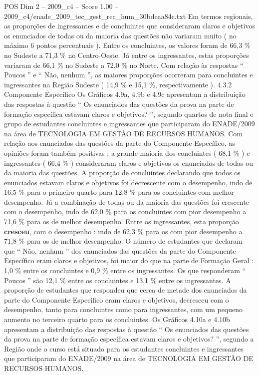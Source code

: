 \begin{textsample}{POS Dim 2 – 2009\_c4 – Score 1.00 – 2009\_c4/enade\_2009\_tec\_gest\_rec\_hum\_30bdeaa84c.txt}
Em termos regionais, as proporções de ingressantes e de concluintes que consideraram claros e objetivos os enunciados de todas ou da maioria das questões não variaram muito ( no máximo 6 pontos percentuais ).
Entre os concluintes, os valores foram de 66,3 \% no Sudeste a 71,3 \% no Centro-Oeste.
Já entre os ingressantes, estas proporções variaram de 66,1 \% no Sudeste a 72,0 \% no Norte.
Com relação às respostas “ Poucos ” e “ Não, nenhum ”, as maiores proporções ocorreram para concluintes e ingressantes na Região Sudeste ( 14,9 \% e 15,1 \%, respectivamente ). 4.3.2 Componente Específico Os Gráficos 4.9a, 4.9b e 4.9c apresentam a distribuição das respostas à questão “ Os enunciados das questões da prova na parte de formação específica estavam claros e objetivos? ”, segundo quartos de nota final e grupo de estudantes concluintes e ingressantes que participaram do ENADE/2009 na área de TECNOLOGIA EM GESTÃO DE RECURSOS HUMANOS.
Com relação aos enunciados das questões da parte do Componente Específico, as opiniões foram também positivas : a grande maioria dos concluintes ( 68,1 \% ) e ingressantes ( 66,4 \% ) consideraram claros e objetivos os enunciados de todas ou da maioria das questões.
A proporção de concluintes declarando que todos os enunciados estavam claros e objetivos foi decrescente com o desempenho, indo de 16,5 \% para o primeiro quarto para 12,8 \% para os concluintes com melhor desempenho.
Já a combinação de todas ou da maioria das questões foi crescente com o desempenho, indo de 62,0 \% para os concluintes com pior desempenho a 71,6 \% para os de melhor desempenho.
Entre os ingressantes, esta proporção \textbf{cresceu}, com o desempenho : indo de 62,3 \% para os com pior desempenho a 71,8 \% para os de melhor desempenho.
O número de estudantes que declaram que “ Não, nenhum ” dos enunciados das questões da parte do Componente Específico eram claros e objetivos, foi maior do que na parte de Formação Geral : 1,0 \% entre os concluintes e 0,9 \% entre os ingressantes.
Os que responderam “ Poucos ” são 12,1 \% entre os concluintes e 13,1 \% entre os ingressantes.
A proporção de estudantes que respondeu que cerca de metade dos enunciados da parte do Componente Específico eram claros e objetivos, decresceu com o desempenho, tanto para concluintes como para ingressantes, com um pequeno aumento no terceiro quarto para os concluintes.
Os Gráficos 4.10a e 4.10b apresentam a distribuição das respostas à questão “ Os enunciados das questões da prova na parte de formação específica estavam claros e objetivos? ”, segundo a Região onde o curso está situado para os estudantes concluintes e ingressantes que participaram do ENADE/2009 na área de TECNOLOGIA EM GESTÃO DE RECURSOS HUMANOS.

\end{textsample}
